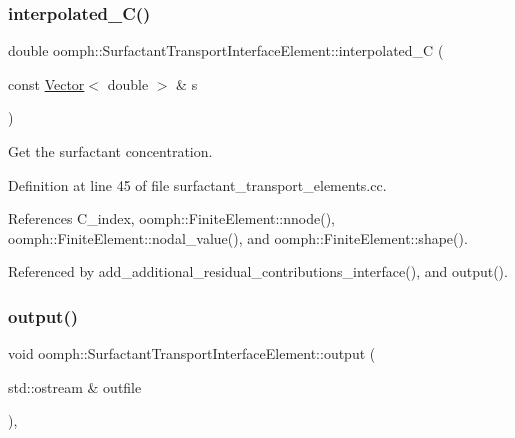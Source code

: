 \subsubsection{\texorpdfstring{interpolated\+\_\+\+C()}{interpolated\_C()}}
{\footnotesize\ttfamily double oomph\+::\+Surfactant\+Transport\+Interface\+Element\+::interpolated\+\_\+C (\begin{DoxyParamCaption}\item[{const \hyperlink{classoomph_1_1Vector}{Vector}$<$ double $>$ \&}]{s }\end{DoxyParamCaption})\hspace{0.3cm}{\ttfamily [protected]}}



Get the surfactant concentration. 



Definition at line 45 of file surfactant\+\_\+transport\+\_\+elements.\+cc.



References C\+\_\+index, oomph\+::\+Finite\+Element\+::nnode(), oomph\+::\+Finite\+Element\+::nodal\+\_\+value(), and oomph\+::\+Finite\+Element\+::shape().



Referenced by add\+\_\+additional\+\_\+residual\+\_\+contributions\+\_\+interface(), and output().

\mbox{\label{classoomph_1_1SurfactantTransportInterfaceElement_a280f065d9cb85438c0fe4f7cd95d14b3}} 
\subsubsection{\texorpdfstring{output()}{output()}\hspace{0.1cm}{\footnotesize\ttfamily [1/4]}}
{\footnotesize\ttfamily void oomph\+::\+Surfactant\+Transport\+Interface\+Element\+::output (\begin{DoxyParamCaption}\item[{std\+::ostream \&}]{outfile }\end{DoxyParamCaption})\hspace{0.3cm}{\ttfamily [inline]}, {\ttfamily [virtual]}}



